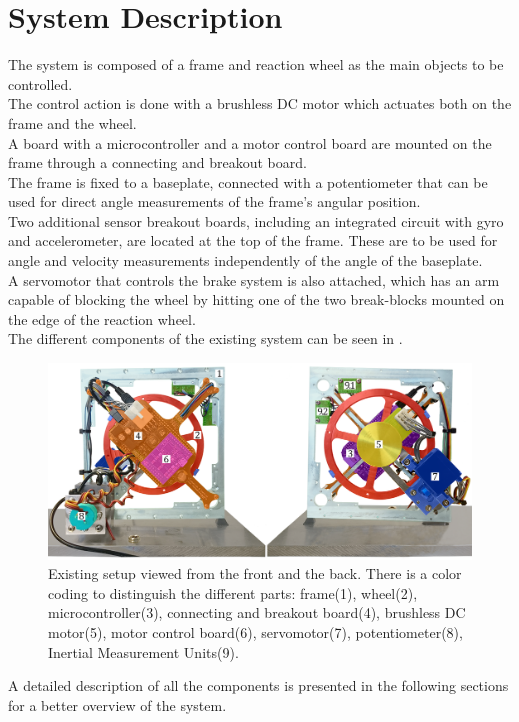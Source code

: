 \chapter{System Description}\label{systemDescription}
The system is composed of a frame and reaction wheel as the main objects to be controlled.\\
The control action is done with a brushless DC motor which actuates both on the frame and the wheel.\\ 
A board with a microcontroller and a motor control board are mounted on the frame through a connecting and breakout board.\\ 
The frame is fixed to a baseplate, connected with a potentiometer that can be used for direct angle measurements of the frame's angular position.\\ 
Two additional sensor breakout boards, including an integrated circuit with gyro and accelerometer, are located at the top of the frame. These are to be used for angle and velocity measurements independently of the angle of the baseplate.\\ 
A servomotor that controls the brake system is also attached, which has an arm capable of blocking the wheel by hitting one of the two break-blocks mounted on the edge of the reaction wheel.\\
The different components of the existing system can be seen in .
\\
\begin{figure}[H]
	\centering
	\includegraphics[scale=0.27]{figures/Cubli12}
	\caption{Existing setup viewed from the front and the back. There is a color coding to distinguish the different parts: frame(1), wheel(2), microcontroller(3), connecting and breakout board(4), brushless DC motor(5), motor control board(6), servomotor(7), potentiometer(8), Inertial Measurement Units(9).}
	\label{CubliParts}
\end{figure}\vspace{-18pt}
A detailed description of all the components is presented in the following sections for a better overview of the system.

